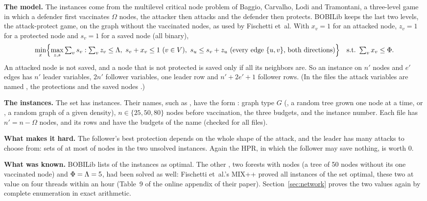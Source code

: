 \textbf{The model.} The instances come from the multilevel critical node problem of Baggio,
Carvalho, Lodi and Tramontani,\cite{baggio2021multilevel} a three-level game in which a defender
first vaccinates $\Omega$ nodes, the attacker then attacks and the defender then protects.
BOBILib keeps the last two levels, the attack-protect game, on the graph without the vaccinated
nodes, as used by Fischetti et~al.\cite{fischetti2017new} With $x_v=1$ for an attacked node,
$z_v=1$ for a protected node and $s_v=1$ for a saved node (all binary),
\[
\min_{x}\Bigl\{\max_{z,s}\textstyle\sum_v s_v :
\sum_v z_v\le\Lambda,\ s_v+x_v\le 1\ (v\in V),\
s_u\le s_v+z_u\ (\text{every edge }\{u,v\}\text{, both directions})\Bigr\}
\quad\text{s.t.}\ \textstyle\sum_v x_v\le\Phi.
\]
An attacked node is not saved, and a node that is not protected is saved only if all its
neighbors are. So an instance on $n'$ nodes and $e'$ edges has $n'$ leader variables, $2n'$
follower variables, one leader row and $n'+2e'+1$ follower rows. (In the files the attack
variables are named \code{y}, the protections \code{x} and the saved nodes \code{a}.)

\textbf{The instances.} The set  has \FamNetworkAll{} instances. Their names,
such as \inst{tree-50\_1-5-5\_006}, have the form
: graph type
$G$ (\code{tree}, a random tree grown one node at a time, or \code{rndgraph}, a random graph of a
given density), $n\in\{25,50,80\}$ nodes before vaccination, the three budgets, and the instance
number. Each file has $n'=n-\Omega$ nodes, and its rows \code{Phi} and \code{Lambda} have the
budgets of the name (checked for all \FamNetworkAll{} files).

\textbf{What makes it hard.} The follower's best protection depends on the whole shape of the
attack, and the leader has many attacks to choose from: \NetworkAttacks{} sets of at most
\NetworkPhi{} of \NetworkNodes{} nodes in the two unsolved instances. Again the HPR, in which
the follower may save nothing, is worth 0.

\textbf{What was known.} BOBILib lists \NetworkBobiOptimal{} of the \FamNetworkAll{} instances as
optimal. The other \FamNetworkUnsolved{}, two forests with \NetworkNodes{} nodes (a tree of 50 nodes
without its one vaccinated node) and $\Phi=\Lambda=5$, had been solved as well:
Fischetti et~al.'s MIX++ proved all \FamNetworkAll{} instances of the set optimal, these two at
value \NetworkOptimum{} on four threads within an hour (Table~9 of the online appendix of their
paper\cite{fischetti2017new,fischetti2016appendix}). Section~\ref{sec:network} proves the two
values again by complete enumeration in exact arithmetic.

